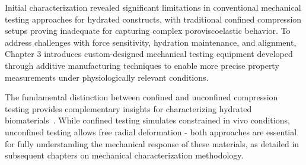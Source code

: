 Initial characterization revealed significant limitations in conventional mechanical testing approaches for hydrated constructs, with traditional confined compression setups proving inadequate for capturing complex poroviscoelastic behavior. To address challenges with force sensitivity, hydration maintenance, and alignment, Chapter 3 introduces custom-designed mechanical testing equipment developed through additive manufacturing techniques to enable more precise property measurements under physiologically relevant conditions.

The fundamental distinction between confined and unconfined compression testing provides complementary insights for characterizing hydrated biomaterials~\cite{bursaconnedunconned,carterindepthguide}. While confined testing simulates constrained in vivo conditions, unconfined testing allows free radial deformation - both approaches are essential for fully understanding the mechanical response of these materials, as detailed in subsequent chapters on mechanical characterization methodology.
